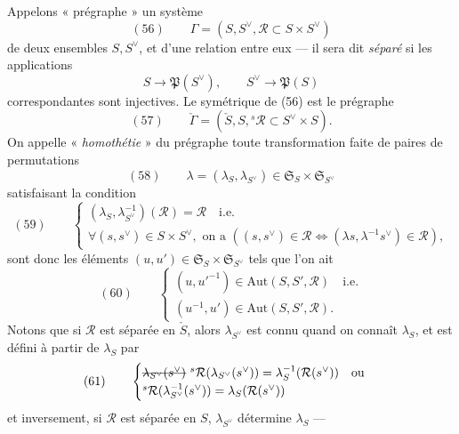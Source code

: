 \documentclass[11pt,a4paper]{article}
\begin{document}
 Appelons « prégraphe » un système
\[
(56)\qquad \Gamma = (S, S^{\vee}, \mathcal{R} \subset S \times S^{\vee})
\]
de deux ensembles $S, S^{\vee}$, et d'une relation entre eux — il sera dit
\emph{séparé} si les applications
\[
S \to \mathfrak{P}(S^{\vee}), \qquad S^{\vee} \to \mathfrak{P}(S)
\]
correspondantes sont injectives. Le symétrique de (56) est le prégraphe
\[
(57)\qquad \check{\Gamma} = (\check{S}, S, {}^{s}\mathcal{R} \subset S^{\vee} \times S) .
\]
On appelle « \emph{homothétie} » du prégraphe toute transformation faite de
paires de permutations
\[
(58)\qquad \lambda = (\lambda_S, \lambda_{S^{\vee}}) \in \mathfrak{S}_S \times \mathfrak{S}_{S^{\vee}}
\]
satisfaisant la condition
\[
(59)\qquad
\begin{cases}
(\lambda_S, \lambda_{S^{\vee}}^{-1})(\mathcal{R}) = \mathcal{R} \quad \text{i.e.} \\
\forall (s, s^{\vee}) \in S \times S^{\vee}, \text{ on a } ((s, s^{\vee}) \in \mathcal{R} \Longleftrightarrow (\lambda s, \lambda^{-1} s^{\vee}) \in \mathcal{R}),
\end{cases}
\]
 sont donc les éléments 
$(u, u') \in \mathfrak{S}_S \times \mathfrak{S}_{S^{\vee}}$ tels que l'on ait
\[
(60)\qquad
\begin{cases}
(u, u'^{-1}) \in \mathrm{Aut}(S, S', \mathcal{R}) \quad \text{i.e.} \\
(u^{-1}, u') \in \mathrm{Aut}(S, S', \mathcal{R}) .
\end{cases}
\]
Notons que si $\mathcal{R}$ est séparée en $\check{S}$, alors
$\lambda_{S^{\vee}}$ est connu quand on connaît $\lambda_S$, et est défini à
partir de $\lambda_S$ par
\[
(61)\qquad
\begin{cases}
\text{\struck{$\lambda_{S^{\vee}}(s^{\vee})$}}\ {}^{s}\mathcal{R}(\lambda_{S^{\vee}}(s^{\vee})) = \lambda_S^{-1}(\mathcal{R}(s^{\vee})) \quad \text{ou} \\
{}^{s}\mathcal{R}(\lambda_{S^{\vee}}^{-1}(s^{\vee})) = \lambda_S(\mathcal{R}(s^{\vee}))
\end{cases}
\]
et inversement, si $\mathcal{R}$ est séparée en $S$, $\lambda_{S^{\vee}}$
détermine $\lambda_S$ —
\end{document}
